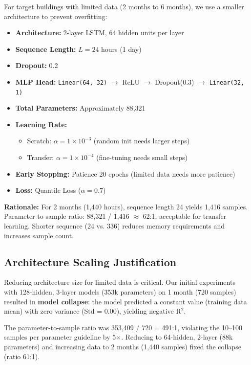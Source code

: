 \documentclass[12pt,a4paper]{report}
\begin{document}
For target buildings with limited data (2 months to 6 months), we use a smaller architecture to prevent overfitting:

\begin{itemize}
    \item \textbf{Architecture:} 2-layer LSTM, 64 hidden units per layer
    \item \textbf{Sequence Length:} \(L = 24\) hours (1 day)
    \item \textbf{Dropout:} 0.2
    \item \textbf{MLP Head:} \texttt{Linear(64, 32)} $\to$ ReLU $\to$ Dropout(0.3) $\to$ \texttt{Linear(32, 1)}
    \item \textbf{Total Parameters:} Approximately 88,321
    \item \textbf{Learning Rate:}
    \begin{itemize}
        \item Scratch: \(\alpha = 1 \times 10^{-3}\) (random init needs larger steps)
        \item Transfer: \(\alpha = 1 \times 10^{-4}\) (fine-tuning needs small steps)
    \end{itemize}
    \item \textbf{Early Stopping:} Patience 20 epochs (limited data needs more patience)
    \item \textbf{Loss:} Quantile Loss (\(\alpha=0.7\))
\end{itemize}

\textbf{Rationale:} For 2 months (1,440 hours), sequence length 24 yields 1,416 samples. Parameter-to-sample ratio: 88,321 / 1,416 $\approx$ 62:1, acceptable for transfer learning. Shorter sequence (24 vs. 336) reduces memory requirements and increases sample count.

\subsection{Architecture Scaling Justification}

Reducing architecture size for limited data is critical. Our initial experiments with 128-hidden, 3-layer models (353k parameters) on 1 month (720 samples) resulted in \textbf{model collapse}: the model predicted a constant value (training data mean) with zero variance (Std = 0.00), yielding negative R$^2$.

The parameter-to-sample ratio was 353,409 / 720 = 491:1, violating the 10--100 samples per parameter guideline by 5$\times$. Reducing to 64-hidden, 2-layer (88k parameters) and increasing data to 2 months (1,440 samples) fixed the collapse (ratio 61:1).
\end{document}
